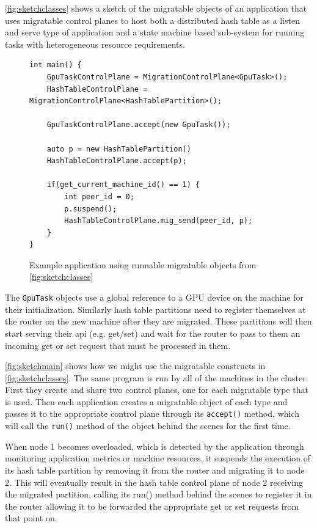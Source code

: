 \autoref{fig:sketchclasses} shows a sketch of the migratable objects of
an application that uses migratable control planes to
host both a distributed hash table as a listen and serve type of
application and a state machine based sub-system for running tasks with
heterogeneous resource requirements.

\begin{figure}[tp]
\begin{lstlisting}
int main() {
    GpuTaskControlPlane = MigrationControlPlane<GpuTask>();
    HashTableControlPlane = MigrationControlPlane<HashTablePartition>();

    GpuTaskControlPlane.accept(new GpuTask());

    auto p = new HashTablePartition()
    HashTableControlPlane.accept(p);

    if(get_current_machine_id() == 1) {
        int peer_id = 0;
        p.suspend();
        HashTableControlPlane.mig_send(peer_id, p);
    }
}
\end{lstlisting}
\caption{
    Example application using runnable migratable objects from \autoref{fig:sketchclasses}
}
\label{fig:sketchmain}
\end{figure}

The \texttt{GpuTask} objects
use a global reference to a GPU device on the machine for their
initialization. Similarly hash table partitions need to register
themselves at the router on the new machine after they are migrated. These
partitions will then start serving their api (e.g. get/set) and wait for
the router to pass to them an incoming get or set request that must be
processed in them.




\autoref{fig:sketchmain} shows how we might use the migratable constructs in
\autoref{fig:sketchclasses}. The same program
is run by all of the machines in the cluster. First they create and share
two control planes, one for each migratable type that is used.
Then each application creates a migratable object of each type and passes
it to the appropriate control plane through its \texttt{accept()} method,
which will call the \texttt{run()} method of the object behind the scenes
for the first time.

When node 1 becomes overloaded, which is detected by the application through
    monitoring application metrics or machine resources, it suspends the execution of
    its hash table partition by removing it from the router
    and migrating it to node 2. This will eventually result in the hash table
    control plane of node 2 receiving the migrated partition, calling its
    run() method behind the scenes to register it in the router allowing
    it to be forwarded the appropriate get or set requests from that
    point on.


